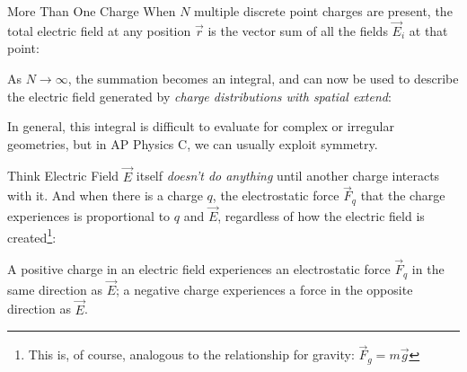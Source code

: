 \documentclass[12pt,aspectratio=169]{beamer}
\begin{document}
\begin{frame}{More Than One Charge}
  When $N$ multiple discrete point charges are present, the total electric
  field at any position $\vec r$ is the vector sum of all the fields $\vec E_i$
  at that point:
    

  As $N\rightarrow\infty$, the summation becomes an integral, and can now be
  used to describe the electric field generated by \emph{charge distributions
  with spatial extend}:

  
  In general, this integral is difficult to evaluate for complex or irregular
  geometries, but in AP Physics C, we can usually exploit symmetry.
\end{frame}



\begin{frame}{Think Electric Field}
  $\vec E$ itself \emph{doesn't do anything} until another charge interacts with
  it. And when there is a charge $q$, the electrostatic force $\vec F_q$ that
  the charge experiences is proportional to $q$ and $\vec E$, regardless of how
  the electric field is created\footnote{This is, of course, analogous to the
  relationship for gravity: $\vec F_g=m\vec g$}:


  A positive charge in an electric field experiences an electrostatic force
  $\vec F_q$ in the same direction as $\vec E$; a negative charge experiences
  a force in the opposite direction as $\vec E$.
\end{frame}
\end{document}
